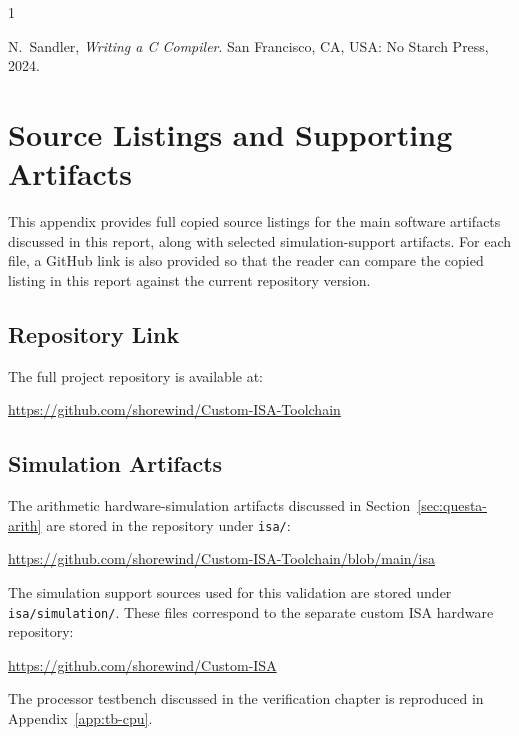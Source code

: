 \documentclass[12pt]{report}
\begin{document}
\begin{thebibliography}{1}

N.~Sandler, \emph{Writing a C Compiler}. San Francisco, CA, USA: No Starch
Press, 2024.

\end{thebibliography}

\appendix
\chapter{Source Listings and Supporting Artifacts}

This appendix provides full copied source listings for the main software artifacts discussed in this report, along with selected simulation-support artifacts. For each file, a GitHub link is also provided so that the reader can compare the copied listing in this report against the current repository version.

\section{Repository Link}

The full project repository is available at:

\begin{center}
\url{https://github.com/shorewind/Custom-ISA-Toolchain}
\end{center}

\section{Simulation Artifacts}
\label{app:sim-artifacts}

The arithmetic hardware-simulation artifacts discussed in
Section~\ref{sec:questa-arith} are stored in the repository under
\texttt{isa/}:

\begin{center}
\url{https://github.com/shorewind/Custom-ISA-Toolchain/blob/main/isa}
\end{center}

The simulation support sources used for this validation are stored under
\texttt{isa/simulation/}. These files correspond to the separate custom ISA
hardware repository:

\begin{center}
\url{https://github.com/shorewind/Custom-ISA}
\end{center}

The processor testbench discussed in the verification chapter is reproduced in
Appendix~\ref{app:tb-cpu}.
\end{document}
